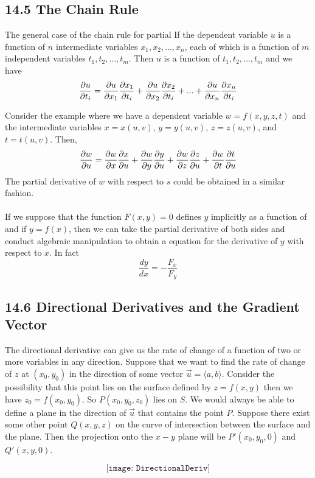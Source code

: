 \documentclass{article}
\begin{document}
	\subsection{14.5 The Chain Rule}
	\begin{mybox}
		{The general case of the chain rule for partial} If the dependent variable $u$
		is a function of $n$ intermediate variables $x_{1},x_{2},...,x_{n}$, each of
		which is a function of $m$ independent variables $t_{1}, t_{2},..., t_{m}$. Then
		$u$ is a function of $t_{1}, t_{2},...,t_{m}$ and we have
		\[
			\pdv{u}{t_i}= \pdv{u}{x_1}\pdv{x_1}{t_i}+ \pdv{u}{x_2}\pdv{x_2}{t_i}+...+\pdv
			{u}{x_n}\pdv{x_n}{t_i}
		\]
	\end{mybox}
	Consider the example where we have a dependent variable $w= f(x,y,z,t)$ and
	the intermediate variables $x=x(u,v)$, $y=y(u,v)$, $z=z(u,v)$, and $t=t(u,v)$.
	Then,
	\[
		\pdv{w}{u}=\pdv{w}{x}\pdv{x}{u}+ \pdv{w}{y}\pdv{y}{u}+ \pdv{w}{z}\pdv{z}{u}+
		\pdv{w}{t}\pdv{t}{u}
	\]
	The partial derivative of $w$ with respect to $s$ could be obtained in a similar
	fashion. \\\\ If we suppose that the function $F(x,y)=0$ defines $y$ implicitly
	as a function of and if $y=f(x)$, then we can take the partial derivative of
	both sides and conduct algebraic manipulation to obtain a equation for the
	derivative of $y$ with respect to $x$. In fact\\
	\[
		\frac{dy}{dx}= -\frac{F_{x}}{F_{y}}
	\]

	\subsection{14.6 Directional Derivatives and the Gradient Vector}
	The directional derivative can give us the rate of change of a function of two
	or more variables in any direction. Suppose that we want to find the rate of
	change of $z$ at $(x_{0},y_{0})$ in the direction of some vector
	$\vec{u}= \langle a, b \rangle$. Consider the possibility that this point lies
	on the surface defined by $z=f(x,y)$ then we have $z_{0} = f(x_{0},y_{0})$. So
	$P(x_{0},y_{0},z_{0})$ lies on $S$. We would always be able to define a plane in
	the direction of $\vec{u}$ that contains the point $P$. Suppose there exist
	some other point $Q(x,y,z)$ on the curve of intersection between the surface
	and the plane. Then the projection onto the $x-y$ plane will be $P'(x_{0},y_{0}
	,0)$ and $Q'(x,y,0)$.

	\[
		\texttt{[image: DirectionalDeriv]}
	\]
\end{document}
